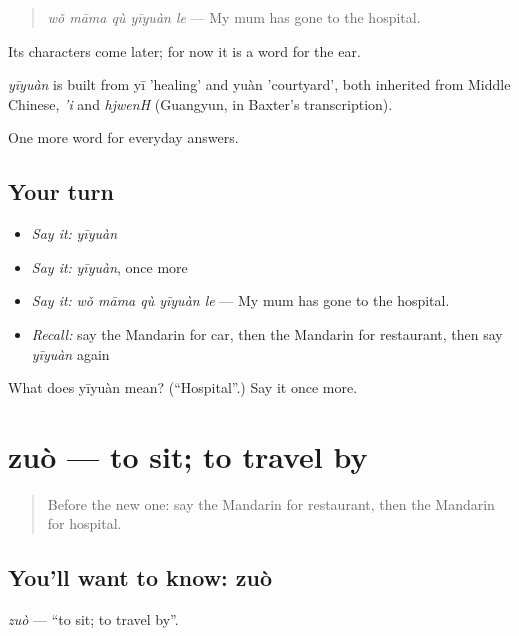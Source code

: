 \begin{quote}
\emph{wǒ māma qù yīyuàn le} — My mum has gone to the hospital.
\end{quote}

Its characters come later; for now it is a word for the ear.

\begin{cousinweb}
\emph{yīyuàn} is built from yī 'healing' and yuàn 'courtyard', both inherited from Middle Chinese, \emph{'i} and \emph{hjwenH} (Guangyun, in Baxter's transcription).
\end{cousinweb}

\begin{grammarlens}[title={What you've built}]
One more word for everyday answers.
\end{grammarlens}

\subsection*{Your turn}
\begin{itemize}
\raggedright
  \item \emph{Say it:} \emph{yīyuàn}
  \item \emph{Say it:} \emph{yīyuàn}, once more
  \item \emph{Say it:} \emph{wǒ māma qù yīyuàn le} — My mum has gone to the hospital.
  \item \emph{Recall:} say the Mandarin for car, then the Mandarin for restaurant, then say \emph{yīyuàn} again
\end{itemize}

\begin{tcolorbox}[breakable,colback=teal!4,colframe=teal!35!black,title={Before you move on}]
What does yīyuàn mean? (\textquotedblleft{}Hospital\textquotedblright{}.) Say it once more.
\end{tcolorbox}
\section[zuò]{zuò — to sit; to travel by}

\label{lesson:ZH-C44-zuo}



\begin{quote}
Before the new one: say the Mandarin for restaurant, then the Mandarin for hospital.
\end{quote}

\subsection*{You'll want to know: zuò}
\emph{zuò} — \textquotedblleft{}to sit; to travel by\textquotedblright{}.

